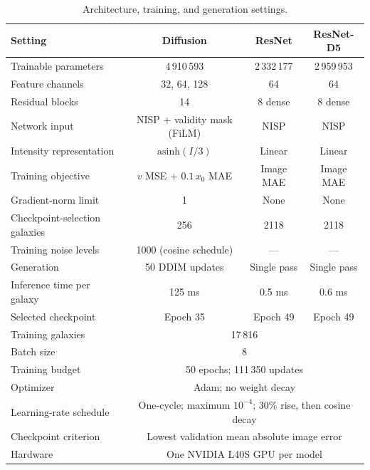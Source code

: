 \documentclass[longauth]{aa}
\begin{document}
\begin{table}[t]
    \caption{Architecture, training, and generation settings.}
    \label{tab:training_settings}
    \centering
    \begin{tabular}{lccc}
        \hline\hline
        Setting & Diffusion & ResNet & ResNet-D5 \\
        \hline
        Trainable parameters & 4\,910\,593 & 2\,332\,177 & 2\,959\,953 \\
        Feature channels & 32, 64, 128 & 64 & 64 \\
        Residual blocks & 14 & 8 dense & 8 dense \\
        Network input & NISP + validity mask (FiLM) & NISP & NISP \\
        Intensity representation & $\mathrm{asinh}(I/3)$ & Linear & Linear \\
        Training objective & $v$ MSE + $0.1\,x_0$ MAE & Image MAE & Image MAE \\
        Gradient-norm limit & 1 & None & None \\
        Checkpoint-selection galaxies & 256 & 2118 & 2118 \\
        Training noise levels & 1000 (cosine schedule) & --- & --- \\
        Generation & 50 DDIM updates & Single pass & Single pass \\
        Inference time per galaxy & 125 ms & 0.5 ms & 0.6 ms \\
        Selected checkpoint & Epoch 35 & Epoch 49 & Epoch 49 \\
        \hline
        Training galaxies & \multicolumn{3}{c}{17\,816} \\
        Batch size & \multicolumn{3}{c}{8} \\
        Training budget & \multicolumn{3}{c}{50 epochs; 111\,350 updates} \\
        Optimizer & \multicolumn{3}{c}{Adam; no weight decay} \\
        Learning-rate schedule & \multicolumn{3}{c}{One-cycle; maximum $10^{-4}$; 30\% rise, then cosine decay} \\
        Checkpoint criterion & \multicolumn{3}{c}{Lowest validation mean absolute image error} \\
        Hardware & \multicolumn{3}{c}{One NVIDIA L40S GPU per model} \\
        \hline
    \end{tabular}
\end{table}
\end{document}

